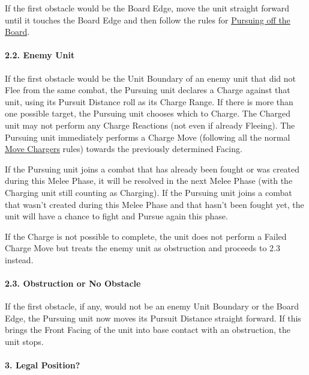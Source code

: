 If the first obstacle would be the Board Edge, move the unit straight forward until it touches the Board Edge and then follow the rules for \hyperref[pursuing_off_the_board]{Pursuing off the Board}.

\paragraph{2.2. Enemy Unit}

If the first obstacle would be the Unit Boundary of an enemy unit that did not Flee from the same combat, the Pursuing unit declares a Charge against that unit, using its Pursuit Distance roll as its Charge Range. If there is more than one possible target, the Pursuing unit chooses which to Charge. The Charged unit may not perform any Charge Reactions (not even if already Fleeing). The Pursuing unit immediately performs a Charge Move (following all the normal \hyperref[move_chargers]{Move Chargers} rules) towards the previously determined Facing.
\par
If the Pursuing unit joins a combat that has already been fought or was created during this Melee Phase, it will be resolved in the next Melee Phase (with the Charging unit still counting as Charging). If the Pursuing unit joins a combat that wasn't created during this Melee Phase and that hasn't been fought yet, the unit will have a chance to fight and Pursue again this phase.
\par
If the Charge is not possible to complete, the unit does not perform a Failed Charge Move but treats the enemy unit as obstruction and proceeds to 2.3 instead.

\paragraph{2.3. Obstruction or No Obstacle}

If the first obstacle, if any, would not be an enemy Unit Boundary or the Board Edge, the Pursuing unit now moves its Pursuit Distance straight forward. If this brings the Front Facing of the unit into base contact with an obstruction, the unit stops.

\newpage
\paragraph{3. Legal Position?}

